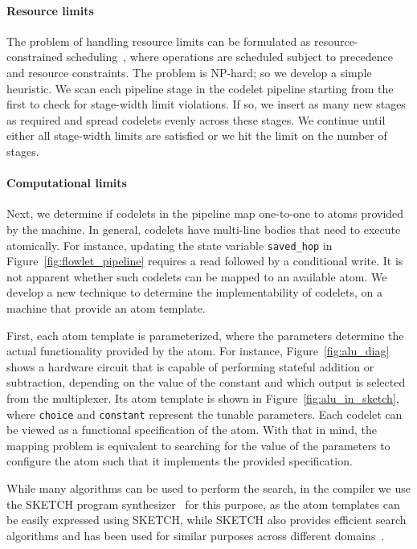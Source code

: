 \paragraph{Resource limits}
The problem of handling resource limits can be formulated as
resource-constrained scheduling~\cite{resource_cons}, where operations are
scheduled subject to precedence and resource constraints. The problem is
NP-hard; so we develop a simple heuristic.  We scan each pipeline stage in the
codelet pipeline starting from the first to check for stage-width limit
violations.  If so, we insert as many new stages as required and spread
codelets evenly across these stages.  We continue until either all stage-width
limits are satisfied or we hit the limit on the number of stages.

\paragraph{Computational limits}
Next, we determine if codelets in the pipeline map one-to-one to atoms provided
by the \absmachine machine. In general, codelets have multi-line bodies that
need to execute atomically. For instance, updating the state variable
\texttt{saved\_hop} in Figure~\ref{fig:flowlet_pipeline} requires a read
followed by a conditional write.  It is not apparent whether such codelets can
be mapped to an available atom. We develop a new technique to determine the
implementability of codelets, on a \absmachine machine that provide an atom
template.

First, each atom template is parameterized, where the parameters determine the
actual functionality provided by the atom.  For instance,
Figure~\ref{fig:alu_diag} shows a hardware circuit that is capable of
performing stateful addition or subtraction, depending on the value of the
constant and which output is selected from the multiplexer.  Its atom template
 is shown in Figure~\ref{fig:alu_in_sketch}, where {\tt choice}
and {\tt constant} represent the tunable parameters.  Each codelet can be
viewed as a functional specification of the atom.  With that in mind, the
mapping problem is equivalent to searching for the value of the parameters to
configure the atom such that it implements the provided specification.

While many algorithms can be used to perform the search, in the \pktlanguage
compiler we use the SKETCH program synthesizer~\cite{sketch_asplos} for this
purpose, as the atom templates can be easily expressed using SKETCH, while
SKETCH also provides efficient search algorithms and has been used for similar
purposes across different domains~\cite{bitstreaming, lifejoin, qbs, chlorophyll}.

